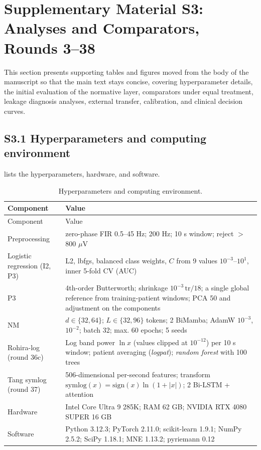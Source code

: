 \setcounter{table}{0}\setcounter{figure}{0}
\renewcommand{\thetable}{S3.\arabic{table}}
\renewcommand{\thefigure}{S3.\arabic{figure}}

\section*{Supplementary Material S3: Analyses and Comparators, Rounds 3--38}\label{sec:s3}

This section presents supporting tables and figures moved from the body of the manuscript so that the main text stays concise, covering hyperparameter details, the initial evaluation of the normative layer, comparators under equal treatment, leakage diagnosis analyses, external transfer, calibration, and clinical decision curves.

\subsection*{S3.1 Hyperparameters and computing environment}
 lists the hyperparameters, hardware, and software.

{\scriptsize
\begin{longtable}{p{}p{}}
\caption{Hyperparameters and computing environment.}\label{tab:hiper}\\
\toprule
Component & Value \\
\midrule
\endfirsthead
\toprule
Component & Value \\
\midrule
\endhead
\bottomrule
\endfoot
Preprocessing & zero-phase FIR 0.5--45 Hz; 200 Hz; 10 s window; reject $>$800 $\mu$V \\
Logistic regression (I2, P3) & L2, lbfgs, balanced class weights, $C$ from 9 values $10^{-3}$--$10^{1}$, inner 5-fold CV (AUC) \\
P3 & 4th-order Butterworth; shrinkage $10^{-3}\,\mathrm{tr}/18$; a single global reference from training-patient windows; PCA 50 and adjustment on the components \\
NM & $d\in\{32,64\}$; $L\in\{32,96\}$ tokens; 2 BiMamba; AdamW $10^{-3}$, $10^{-2}$; batch 32; max. 60 epochs; 5 seeds \\
Rohira-log (round 36c) & Log band power $\ln x$ (values clipped at $10^{-12}$) per 10 s window; patient averaging (\textit{logpat}); \textit{random forest} with 100 trees \\
Tang symlog (round 37) & 506-dimensional per-second features; transform $\mathrm{symlog}(x) = \mathrm{sign}(x)\ln(1+|x|)$; 2 Bi-LSTM + attention \\
Hardware & Intel Core Ultra 9 285K; RAM 62 GB; NVIDIA RTX 4080 SUPER 16 GB \\
Software & Python 3.12.3; PyTorch 2.11.0; scikit-learn 1.9.1; NumPy 2.5.2; SciPy 1.18.1; MNE 1.13.2; pyriemann 0.12 \\
\end{longtable}
}


